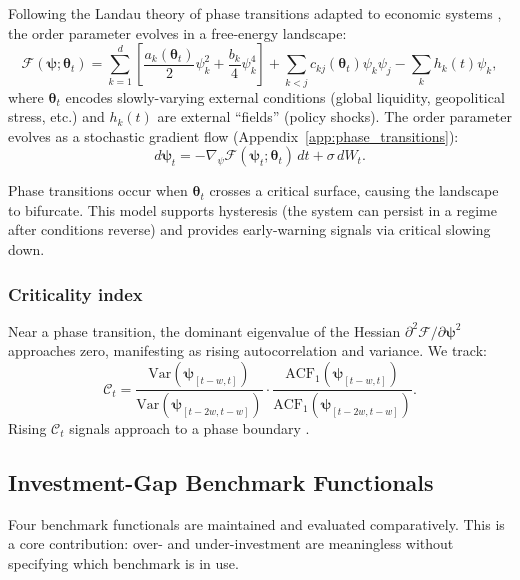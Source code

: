 \documentclass[11pt,a4paper]{article}
\theoremstyle{definition}
\newcommand{\Var}{\mathrm{Var}}
\newcommand{\bpsi}{\bm{\psi}}
\begin{document}
Following the Landau theory of phase transitions \citep{landau1937theory} adapted to economic systems \citep{sornette2003critical}, the order parameter evolves in a free-energy landscape:
\begin{equation}
  \mathcal{F}(\bpsi; \bm{\theta}_t) = \sum_{k=1}^{d}\left[\frac{a_k(\bm{\theta}_t)}{2}\psi_k^2 + \frac{b_k}{4}\psi_k^4\right] + \sum_{k < j} c_{kj}(\bm{\theta}_t)\psi_k\psi_j - \sum_k h_k(t)\psi_k,
  \label{eq:free_energy}
\end{equation}
where $\bm{\theta}_t$ encodes slowly-varying external conditions (global liquidity, geopolitical stress, etc.) and $h_k(t)$ are external ``fields'' (policy shocks). The order parameter evolves as a stochastic gradient flow (Appendix~\ref{app:phase_transitions}):
\begin{equation}
  d\bpsi_t = -\nabla_\psi \mathcal{F}(\bpsi_t; \bm{\theta}_t)\,dt + \sigma\,dW_t.
  \label{eq:gradient_flow}
\end{equation}

Phase transitions occur when $\bm{\theta}_t$ crosses a critical surface, causing the landscape to bifurcate. This model supports hysteresis (the system can persist in a regime after conditions reverse) and provides early-warning signals via critical slowing down.

\subsubsection{Criticality index}

Near a phase transition, the dominant eigenvalue of the Hessian $\partial^2\mathcal{F}/\partial\bpsi^2$ approaches zero, manifesting as rising autocorrelation and variance. We track:
\begin{equation}
  \mathcal{C}_t = \frac{\Var(\bpsi_{[t-w,t]})}{\Var(\bpsi_{[t-2w,t-w]})} \cdot \frac{\mathrm{ACF}_1(\bpsi_{[t-w,t]})}{\mathrm{ACF}_1(\bpsi_{[t-2w,t-w]})}.
  \label{eq:criticality}
\end{equation}
Rising $\mathcal{C}_t$ signals approach to a phase boundary \citep{scheffer2009early,dakos2012methods}.

\subsection{Investment-Gap Benchmark Functionals}
\label{sec:gap_computation}

Four benchmark functionals are maintained and evaluated comparatively. This is a core contribution: over- and under-investment are meaningless without specifying which benchmark is in use.
\end{document}
